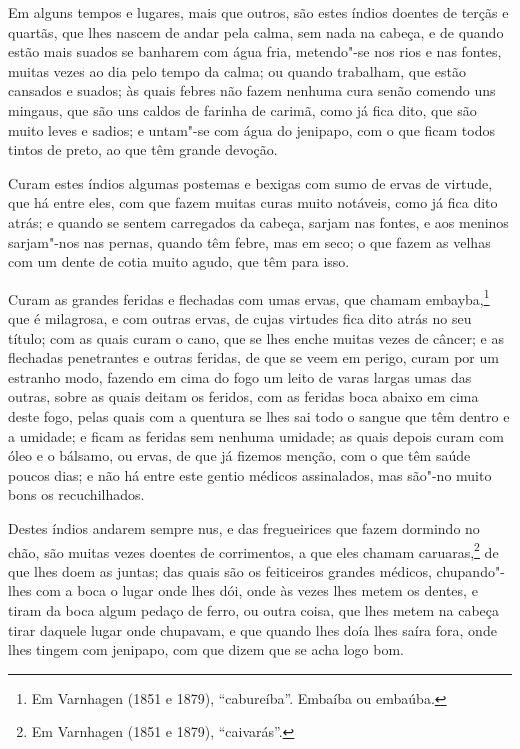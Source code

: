 \begin{linenumbers}
Em alguns tempos e lugares, mais que outros, são estes índios doentes de terçãs e quartãs,
que lhes nascem de andar pela calma, sem nada na cabeça, e de quando estão mais suados se
banharem com água fria, metendo"-se nos rios e nas fontes, muitas vezes ao dia pelo tempo
da calma; ou quando trabalham, que estão cansados e suados; às quais febres não fazem
nenhuma cura senão comendo uns mingaus, que são uns caldos de farinha de carimã, como já
fica dito, que são muito leves e sadios; e untam"-se com água do jenipapo, com o que ficam
todos tintos de preto, ao que têm grande devoção.

Curam estes índios algumas postemas e bexigas com sumo de ervas de virtude, que há entre
eles, com que fazem muitas curas muito notáveis, como já fica dito atrás; e quando se
sentem carregados da cabeça, sarjam nas fontes, e aos meninos sarjam"-nos nas pernas, quando
têm febre, mas em seco; o que fazem as velhas com um dente de cotia muito agudo, que têm
para isso.

Curam as grandes feridas e flechadas com umas ervas, que chamam embayba,\footnote{ Em
Varnhagen (1851 e 1879), ``cabureíba''. Embaíba ou embaúba.} que é milagrosa, e com
outras ervas, de cujas virtudes fica dito atrás no seu título; com as quais curam o cano,
que se lhes enche muitas vezes de câncer; e as flechadas penetrantes e outras feridas, de
que se veem em perigo, curam por um estranho modo, fazendo em cima do fogo um leito de
varas largas umas das outras, sobre as quais deitam os feridos, com as feridas boca abaixo
em cima deste fogo, pelas quais com a quentura se lhes sai todo o sangue que têm dentro e
a umidade; e ficam as feridas sem nenhuma umidade; as quais depois curam com óleo e o
bálsamo, ou ervas, de que já fizemos menção, com o que têm saúde poucos dias; e não há
entre este gentio médicos assinalados, mas são"-no muito bons os recuchilhados.


Destes índios andarem sempre nus, e das fregueirices que fazem dormindo no chão, são
muitas vezes doentes de corrimentos, a que eles chamam caruaras,\footnote{ Em Varnhagen
(1851 e 1879), ``caivarás''.} de que lhes doem as juntas; das quais são os feiticeiros
grandes médicos, chupando"-lhes com a boca o lugar onde lhes dói, onde às vezes lhes metem
os dentes, e tiram da boca algum pedaço de ferro, ou outra coisa, que lhes metem na cabeça
tirar daquele lugar onde chupavam, e que quando lhes doía lhes saíra fora, onde lhes
tingem com jenipapo, com que dizem que se acha logo bom.


\end{linenumbers}
